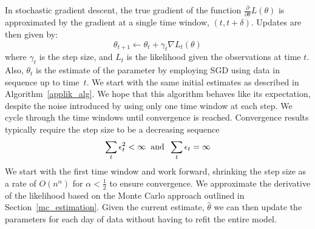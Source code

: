 \documentclass{acm_proc_article-sp}
\begin{document}
In stochastic gradient descent, the true gradient of the function $\frac{\partial}{\partial \theta} L( \theta)$ is approximated by the gradient at a single time window, $(t, t+\delta)$.  Updates are then given by:
\begin{equation}
\theta_{t+1} \gets \theta_{t} + \gamma_t \nabla L_t (\theta) 
\end{equation}
\noindent where $\gamma_t$ is the step size, and $L_t$ is the likelihood given the observations at time $t$.  Also, $\theta_t$ is the estimate of the parameter by employing SGD using data in sequence up to time~$t$.  We start with the same initial estimates as described in Algorithm~\ref{applik_alg}.  We hope that this algorithm behaves like its expectation, despite the noise introduced by using only one time window at each step.  We cycle through the time windows until convergence is reached. Convergence results typically require the step size to be a decreasing sequence 
\begin{equation} \label{sgd_conditions}
\sum_{t} \epsilon_t^2 < \infty \hspace{0.2 cm} \text{and} \hspace{0.2cm} \sum_{t} \epsilon_t = \infty
\end{equation}
\noindent We start with the first time window and work forward, shrinking the step size as a rate of $O(n^{\alpha})$ for $\alpha < \frac{1}{2}$ to ensure convergence.  We approximate the derivative of the likelihood based on the Monte Carlo approach outlined in Section~\ref{mc_estimation}.  Given the current estimate, $\hat{\theta}$ we can then update the parameters for each day of data without having to refit the entire model.
\end{document}

